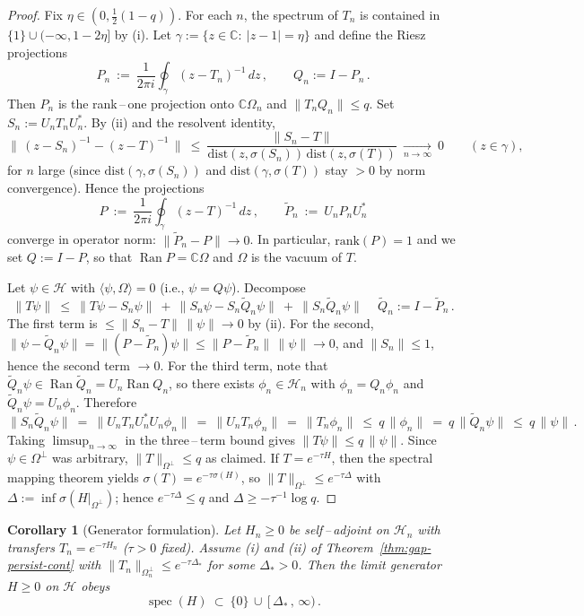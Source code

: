 \documentclass[11pt]{amsart}
\theoremstyle{plain}
\newtheorem{corollary}[theorem]{Corollary}
\theoremstyle{definition}
\theoremstyle{remark}
\begin{document}
\begin{proof}
Fix $\eta\in(0,\tfrac{1}{2}(1-q))$. For each $n$, the spectrum of $T_n$ is contained in $\{1\}\cup (-\infty,1-2\eta]$ by (i). Let $\gamma:=\{z\in\mathbb C:\ |z-1|=\eta\}$ and define the Riesz projections
\[
  P_n\ :=\ \frac{1}{2\pi i}\oint_{\gamma} (z-T_n)^{-1}\,dz\,,\qquad Q_n:=I-P_n\,.
\]
Then $P_n$ is the rank\,–\,one projection onto $\mathbb C\Omega_n$ and $\|T_n Q_n\|\le q$. Set $S_n:=U_n T_n U_n^*$. By (ii) and the resolvent identity,
\[
  \big\|\,(z-S_n)^{-1}-(z-T)^{-1}\,\big\|\ \le\ \frac{\|S_n-T\|}{\mathrm{dist}(z,\sigma(S_n))\,\mathrm{dist}(z,\sigma(T))}\ \xrightarrow[n\to\infty]{}\ 0\qquad(z\in\gamma),
\]
for $n$ large (since $\mathrm{dist}(\gamma,\sigma(S_n))$ and $\mathrm{dist}(\gamma,\sigma(T))$ stay $>0$ by norm convergence). Hence the projections
\[
  P\ :=\ \frac{1}{2\pi i}\oint_{\gamma} (z-T)^{-1}\,dz\,,\qquad \widetilde P_n\ :=\ U_n P_n U_n^*
\]
converge in operator norm: $\|\widetilde P_n-P\|\to 0$. In particular, $\mathrm{rank}(P)=1$ and we set $Q:=I-P$, so that $\operatorname{Ran}P=\mathbb C\Omega$ and $\Omega$ is the vacuum of $T$.

Let $\psi\in\mathcal H$ with $\langle\psi,\Omega\rangle=0$ (i.e., $\psi=Q\psi$). Decompose
\[
  \|T\psi\|\ \le\ \|T\psi - S_n\psi\|\ +\ \|S_n\psi - S_n\widetilde Q_n\psi\|\ +\ \|S_n\widetilde Q_n\psi\|\,\quad \widetilde Q_n:=I-\widetilde P_n\,.
\]
The first term is $\le \|S_n-T\|\,\|\psi\|\xrightarrow{}0$ by (ii). For the second, $\|\psi-\widetilde Q_n\psi\|=\| (P-\widetilde P_n)\psi\|\le \|P-\widetilde P_n\|\,\|\psi\|\xrightarrow{}0$, and $\|S_n\|\le 1$, hence the second term $\xrightarrow{}0$. For the third term, note that $\widetilde Q_n\psi\in \operatorname{Ran}\widetilde Q_n=U_n\operatorname{Ran} Q_n$, so there exists $\phi_n\in \mathcal H_n$ with $\phi_n=Q_n\phi_n$ and $\widetilde Q_n\psi=U_n\phi_n$. Therefore
\[
  \|S_n\widetilde Q_n\psi\|\ =\ \|U_n T_n U_n^* U_n\phi_n\|\ =\ \|U_n T_n\phi_n\|\ =\ \|T_n\phi_n\|\ \le\ q\,\|\phi_n\|\ =\ q\,\|\widetilde Q_n\psi\|\ \le\ q\,\|\psi\|\,.
\]
Taking $\limsup_{n\to\infty}$ in the three\,–\,term bound gives $\|T\psi\|\le q\,\|\psi\|$. Since $\psi\in\Omega^{\perp}$ was arbitrary, $\|T\|_{\Omega^{\perp}}\le q$ as claimed. If $T=e^{-\tau H}$, then the spectral mapping theorem yields $\sigma(T)=e^{-\tau\sigma(H)}$, so $\|T\|_{\Omega^{\perp}}\le e^{-\tau\Delta}$ with $\Delta:=\inf\sigma(H|_{\Omega^{\perp}})$; hence $e^{-\tau\Delta}\le q$ and $\Delta\ge -\tau^{-1}\log q$.
\end{proof}

\begin{corollary}[Generator formulation]\label{cor:gap-persist-generator}
Let $H_n\ge 0$ be self\,–\,adjoint on $\mathcal H_n$ with transfers $T_n=e^{-\tau H_n}$ ($\tau>0$ fixed). Assume (i) and (ii) of Theorem~\ref{thm:gap-persist-cont} with $\|T_n\|_{\Omega_n^{\perp}}\le e^{-\tau\Delta_*}$ for some $\Delta_*>0$. Then the limit generator $H\ge 0$ on $\mathcal H$ obeys
\[
  \operatorname{spec}(H)\ \subset\ \{0\}\,\cup\,[\,\Delta_*\,,\,\infty)\,.
\]
\end{corollary}
\end{document}
